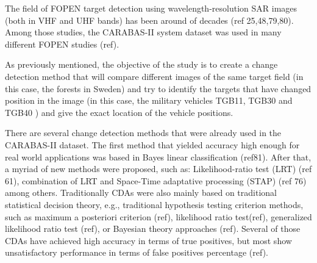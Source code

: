 The field of FOPEN target detection using wavelength-resolution SAR images (both in VHF and UHF bands) has been 
around of decades (ref 25,48,79,80). Among those studies, the CARABAS-II system dataset was used in many different FOPEN studies 
(ref). 

As previously mentioned, the objective of the study is to create a change detection method that will compare 
different images of the same target field (in this case, the forests in Sweden) and try to identify the targets that 
have changed position in the image (in this case, the military vehicles TGB11, TGB30 and TGB40 ) and give the exact location of the vehicle positions.


There are several change detection methods that were already used in the CARABAS-II dataset.
The first method that yielded accuracy high enough for real world applications was based in Bayes linear classification (ref81).
After that, a myriad of new methods were proposed, such as: Likelihood-ratio test (LRT) (ref 61), combination of LRT and Space-Time 
adaptative processing (STAP) (ref 76) among others. Traditionally CDAs were also mainly based on traditional statistical decision theory, e.g., 
traditional hypothesis testing criterion methods, such as maximum a posteriori 
criterion (ref), likelihood ratio test(ref), generalized likelihood ratio test (ref), 
or Bayesian theory approaches (ref). Several of those CDAs have achieved high accuracy 
in terms of true positives, but most show unsatisfactory performance in terms of false positives percentage (ref).





